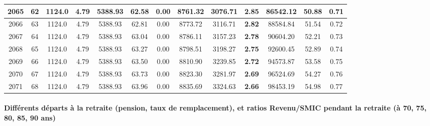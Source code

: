 {\begin{center}
\begin{tabular}[htb]{|c|c||c|c|c|c|c|c||c|c||c|c|c||}
\hline 
 2065 &  62 &  1124.0 &  4.79 &  5388.93 &  62.58 &  0.00 &  8761.32 &  3076.71 &  {\bf 2.85} &  86542.12 &  50.88 &  0.71 \\ 
\hline 
 2066 &  63 &  1124.0 &  4.79 &  5388.93 &  62.81 &  0.00 &  8773.72 &  3116.71 &  {\bf 2.82} &  88584.84 &  51.54 &  0.72 \\ 
\hline 
 2067 &  64 &  1124.0 &  4.79 &  5388.93 &  63.04 &  0.00 &  8786.11 &  3157.23 &  {\bf 2.78} &  90604.20 &  52.21 &  0.73 \\ 
\hline 
 2068 &  65 &  1124.0 &  4.79 &  5388.93 &  63.27 &  0.00 &  8798.51 &  3198.27 &  {\bf 2.75} &  92600.45 &  52.89 &  0.74 \\ 
\hline 
 2069 &  66 &  1124.0 &  4.79 &  5388.93 &  63.50 &  0.00 &  8810.90 &  3239.85 &  {\bf 2.72} &  94573.87 &  53.58 &  0.75 \\ 
\hline 
 2070 &  67 &  1124.0 &  4.79 &  5388.93 &  63.73 &  0.00 &  8823.30 &  3281.97 &  {\bf 2.69} &  96524.69 &  54.27 &  0.76 \\ 
\hline 
 2071 &  68 &  1124.0 &  4.79 &  5388.93 &  63.96 &  0.00 &  8835.69 &  3324.63 &  {\bf 2.66} &  98453.19 &  54.98 &  0.77 \\ 
\hline 
\hline 
\end{tabular} 
\end{center} } 
\newpage 
 
\paragraph{Différents départs à la retraite (pension, taux de remplacement), et ratios Revenu/SMIC pendant la retraite (à 70, 75, 80, 85, 90 ans)} 

